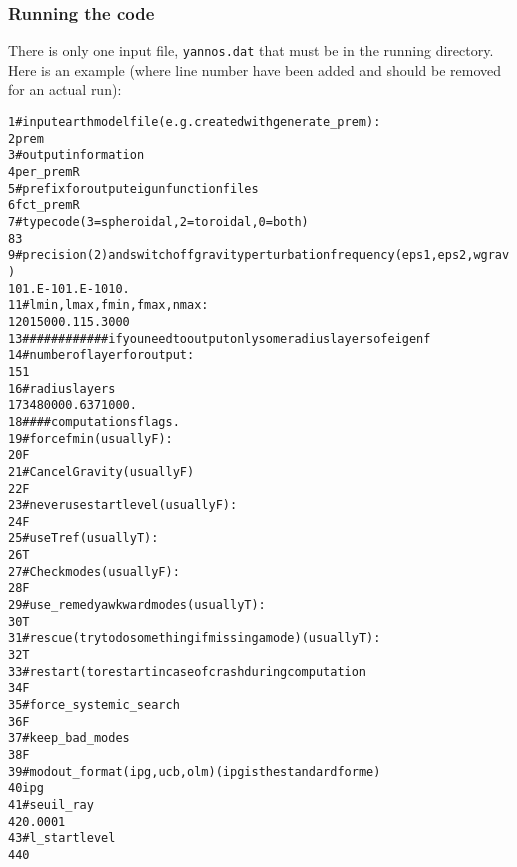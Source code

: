 \documentclass[11pt]{article}
\begin{document}
\subsubsection{Running the code}
There is only one input file, {\tt yannos.dat} that must be in the
running directory. Here is an example (where line number have been
added and should be removed for an actual run):
\begin{alltt}
\small
 1 #input earth model file (e.g. created with generate_prem) :
 2 prem
 3 #output information
 4 per_premR
 5 #prefix for output eigunfunction files
 6 fct_premR
 7 #type code (3=spheroidal, 2=toroidal, 0=both)
 8 3
 9 #precision (2) and switch off gravity perturbation frequency (eps1,eps2,wgrav)
10 1.E-10 1.E-10 10.
11 #lmin, lmax, fmin, fmax, nmax:
12 0 1500 0.1 15. 3000
13 ############if you need to output only some radius layers of eigenf
14 #number of layer for output:
15 1
16 #radius layers
17 3480000. 6371000.
18 #### computations flags. 
19 # force fmin (usually F):
20 F
21 # Cancel Gravity (usually F)
22 F
23 # never use start level (usually F):
24 F
25 #use T ref (usually T):
26 T
27 #Check modes (usually F):
28 F
29 # use_remedy  awkward modes (usually T):
30 T
31 # rescue  (try to do something if missing a mode ) (usually T):
32 T
33 #restart (to restart in case of crash during computation
34 F
35 #force_systemic_search
36 F
37 # keep_bad_modes
38 F
39 #  modout_format (ipg, ucb, olm) (ipg is the standard for me)
40 ipg
41 # seuil_ray
42 0.0001
43 # l_startlevel
44 0
\end{alltt}	
\end{document}
